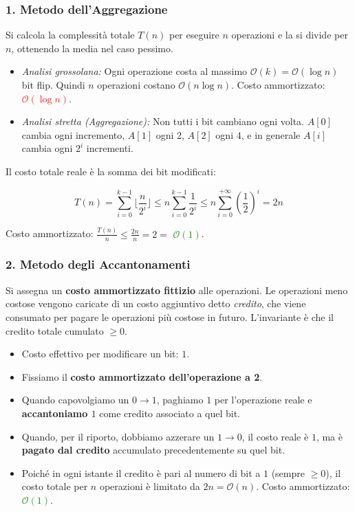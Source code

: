 \documentclass[12pt, a4paper]{article}
\begin{document}
\subsubsection{1. Metodo dell'Aggregazione}
Si calcola la complessità totale $T(n)$ per eseguire $n$ operazioni e la si divide per $n$, ottenendo la media nel caso pessimo.
\begin{itemize}
\item \textit{Analisi grossolana:} Ogni operazione costa al massimo $\mathcal{O}(k) = \mathcal{O}(\log n)$ bit flip. Quindi $n$ operazioni costano $\mathcal{O}(n \log n)$. Costo ammortizzato: \textcolor{red}{$\mathcal{O}(\log n)$}.
\item \textit{Analisi stretta (Aggregazione):} Non tutti i bit cambiano ogni volta. $A[0]$ cambia ogni incremento, $A[1]$ ogni 2, $A[2]$ ogni 4, e in generale $A[i]$ cambia ogni $2^i$ incrementi.
\end{itemize}
Il costo totale reale è la somma dei bit modificati:


$$T(n) = \sum_{i=0}^{k-1} \lfloor \frac{n}{2^i} \rfloor \le n \sum_{i=0}^{k-1} \frac{1}{2^i} \le n \sum_{i=0}^{+\infty} \left(\frac{1}{2}\right)^i = 2n$$


Costo ammortizzato: $\frac{T(n)}{n} \le \frac{2n}{n} = 2 =$ \textcolor{green}{$\mathcal{O}(1)$}.

\subsubsection{2. Metodo degli Accantonamenti}
Si assegna un \textbf{costo ammortizzato fittizio} alle operazioni. Le operazioni meno costose vengono caricate di un costo aggiuntivo detto \textit{credito}, che viene consumato per pagare le operazioni più costose in futuro. L'invariante è che il credito totale cumulato $\ge 0$.

\begin{itemize}
\item Costo effettivo per modificare un bit: $1$.
\item Fissiamo il \textbf{costo ammortizzato dell'operazione a 2}.
\item Quando capovolgiamo un $0 \to 1$, paghiamo $1$ per l'operazione reale e \textbf{accantoniamo $1$} come credito associato a quel bit.
\item Quando, per il riporto, dobbiamo azzerare un $1 \to 0$, il costo reale è $1$, ma è \textbf{pagato dal credito} accumulato precedentemente su quel bit.
\item Poiché in ogni istante il credito è pari al numero di bit a $1$ (sempre $\ge 0$), il costo totale per $n$ operazioni è limitato da $2n = \mathcal{O}(n)$. Costo ammortizzato: \textcolor{green}{$\mathcal{O}(1)$}.
\end{itemize}
\end{document}
